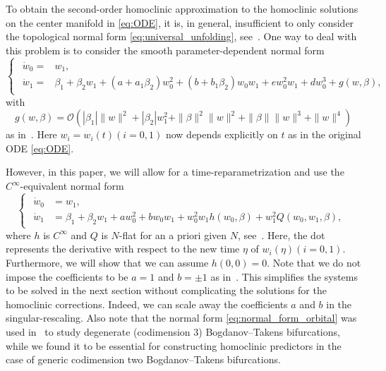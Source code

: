 To obtain the second-order homoclinic approximation to the homoclinic solutions
on the center manifold in \cref{eq:ODE}, it is, in general, insufficient to
only consider the topological normal form \cref{eq:universal_unfolding},
see~\cite{Broer1991}.  One way to deal with this problem is to consider the
smooth parameter-dependent normal form 
\begin{equation}
\label{eq:BT_smooth_nf}
\begin{cases}
\begin{aligned}
\dot{w}_0 = & w_1,\\
\dot{w}_1 = & \beta_1+\beta_2 w_1+\left(a+a_1\beta_2\right)w_0^{2}
 +\left(b+b_1\beta_2\right) w_0w_1+ew_0^{2}w_1+dw_0^{3} + g(w,\beta),
\end{aligned}
\end{cases}
\end{equation}
with
\[
    g(w,\beta) = \mathcal O(|\beta_1|\|w\|^2 + |\beta_2| w_1^2 + \|\beta\|^2\|w\|^2
					 + \|\beta\|\|w\|^3 + \|w\|^4)
\] 
as in~\cite{Gray-Scott2015,Al-Hdaibat2016}. Here $w_i=w_i(t)(i=0,1)$ now
depends explicitly on $t$ as in the original ODE \cref{eq:ODE}.

However, in this paper, we will allow for a time-reparametrization and use the
$C^\infty$-equivalent normal form 
\begin{equation}
\label{eq:normal_form_orbital}
\begin{cases}
\begin{aligned}
	\dot w_0 &= w_1, \\
	\dot w_1 &= \beta_1 + \beta_2 w_1 + aw_0^2 + b w_0 w_1 + w_0^2 w_1
								h(w_0,\beta) + w_1^2 Q(w_0,w_1,\beta),
\end{aligned}
\end{cases}
\end{equation}
where $h$ is $C^\infty$ and $Q$ is $N$-flat for an a priori given $N$,
see~\cite{Broer1991}. Here, the dot represents the derivative with respect to
the new time $\eta$ of $w_i(\eta)(i=0,1)$.  Furthermore, we will show that we
can assume $h(0,0)=0$. Note that we do not impose the coefficients to be $a=1$
and $b=\pm 1$ as in~\cite{Broer1991}. This simplifies the systems to be solved
in the next section without complicating the solutions for the homoclinic
corrections. Indeed, we can scale away the coefficients $a$ and $b$ in the
singular-rescaling. Also note that the normal form
\cref{eq:normal_form_orbital} was used in~\cite{Broer1991} to study degenerate
(codimension 3) Bogdanov--Takens bifurcations, while we found it to be essential
for constructing homoclinic predictors in the case of generic codimension two
Bogdanov--Takens bifurcations.

